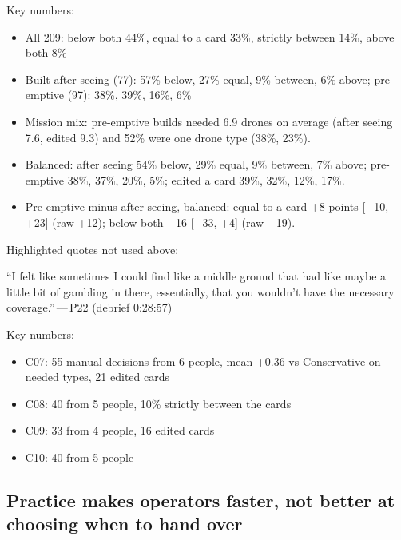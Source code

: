 \begin{options}
\noindent Key numbers:\begin{itemize}[leftmargin=1.2em,itemsep=0pt]\footnotesize
\item All 209: below both 44\%, equal to a card 33\%, strictly between 14\%, above both 8\%
\item Built after seeing (77): 57\% below, 27\% equal, 9\% between, 6\% above; pre-emptive (97): 38\%, 39\%, 16\%, 6\%
\item Mission mix: pre-emptive builds needed 6.9 drones on average (after seeing 7.6, edited 9.3) and 52\% were one drone type (38\%, 23\%).
\item Balanced: after seeing 54\% below, 29\% equal, 9\% between, 7\% above; pre-emptive 38\%, 37\%, 20\%, 5\%; edited a card 39\%, 32\%, 12\%, 17\%.
\item Pre-emptive minus after seeing, balanced: equal to a card +8 points [$-$10, +23] (raw +12); below both $-$16 [$-$33, +4] (raw $-$19).
\end{itemize}

\noindent Highlighted quotes not used above:\begin{quotelist}
\item ``I felt like sometimes I could find like a middle ground that had like maybe a little bit of gambling in there, essentially, that you wouldn't have the necessary coverage.''\,---\,P22 (debrief 0:28:57)
\end{quotelist}


\noindent Key numbers:\begin{itemize}[leftmargin=1.2em,itemsep=0pt]\footnotesize
\item C07: 55 manual decisions from 6 people, mean +0.36 vs Conservative on needed types, 21 edited cards
\item C08: 40 from 5 people, 10\% strictly between the cards
\item C09: 33 from 4 people, 16 edited cards
\item C10: 40 from 5 people
\end{itemize}
\end{options}

\clearpage


\subsection{Practice makes operators faster, not better at choosing when to hand over}\label{sec:res:practice}

